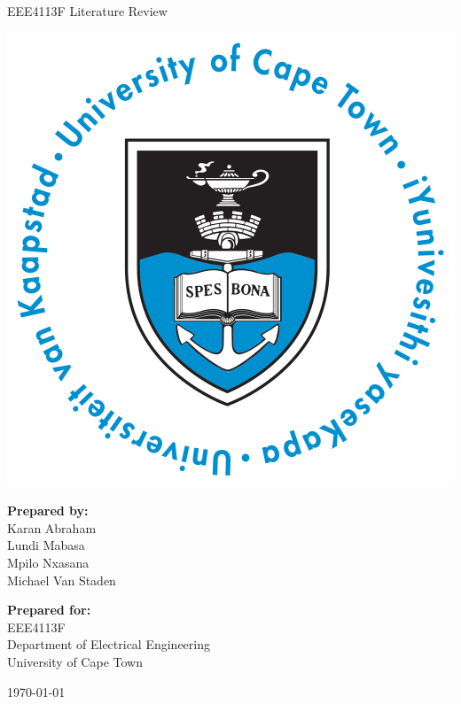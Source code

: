 \thispagestyle{empty}
\begin{center}
    
\Huge

\vspace{5cm}

EEE4113F Literature Review

\vspace{2.5cm}

\includegraphics[width=0.4\linewidth]{FrontMatter/UCT_logo.png}

\vfill

\large
\textbf{Prepared by:}\\
Karan Abraham\\
Lundi Mabasa\\
Mpilo Nxasana\\
Michael Van Staden\\


\vspace{1cm}

\textbf{Prepared for:}\\
EEE4113F\\
Department of Electrical Engineering\\
University of Cape Town

\vspace{2cm}

\today


\end{center}